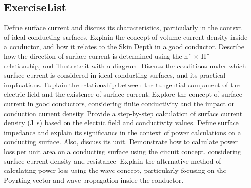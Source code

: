 \begin{mdframed}[backgroundcolor=lightblue, linewidth=1pt,  hidealllines=true]
\section{ExerciseList}
\begin{ExerciseList}
	\Exercise[label={ex11}] Define surface current and discuss its characteristics, particularly in the context of ideal conducting surfaces.
	\Exercise[label={ex11}] Explain the concept of volume current density inside a conductor, and how it relates to the Skin Depth in a good conductor.
	\Exercise[label={ex11}] Describe how the direction of surface current is determined using the nˆ × Hˆ relationship, and illustrate it with a diagram.
	\Exercise[label={ex11}] Discuss the conditions under which surface current is considered in ideal conducting surfaces, and its practical implications.
	\Exercise[label={ex11}] Explain the relationship between the tangential component of the electric field and the existence of surface current.
	\Exercise[label={ex11}] Explore the concept of surface current in good conductors, considering finite conductivity and the impact on conduction current density.
	\Exercise[label={ex11}] Provide a step-by-step calculation of surface current density (J¯s) based on the electric field and conductivity values.
	\Exercise[label={ex11}] Define surface impedance and explain its significance in the context of power calculations on a conducting surface. Also, discuss its unit.
	\Exercise[label={ex11}] Demonstrate how to calculate power loss per unit area on a conducting surface using the circuit concept, considering surface current density and resistance.
	\Exercise[label={ex11}] Explain the alternative method of calculating power loss using the wave concept, particularly focusing on the Poynting vector and wave propagation inside the conductor.
\end{ExerciseList}
\end{mdframed}
